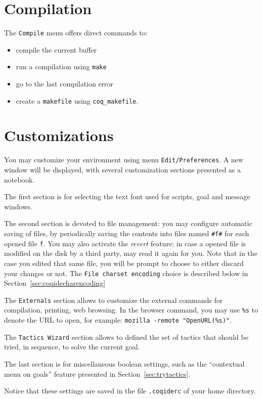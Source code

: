 \section{Compilation}

The \verb|Compile| menu offers direct commands to:
\begin{itemize}
\item compile the current buffer
\item run a compilation using \verb|make|
\item go to the last compilation error
\item create a \verb|makefile| using \verb|coq_makefile|.
\end{itemize}

\section{Customizations}

You may customize your environment using menu
\texttt{Edit/Preferences}. A new window will be displayed, with
several customization sections presented as a notebook. 

The first section is for selecting the text font used for scripts, goal
and message windows. 

The second section is devoted to file management: you may
configure automatic saving of files, by periodically saving the
contents into files named \verb|#f#| for each opened file
\verb|f|. You may also activate the \emph{revert} feature: in case a
opened file is modified on the disk by a third party, \CoqIDE{} may read
it again for you. Note that in the case you edited that same file, you
will be prompt to choose to either discard your changes or not. The
\texttt{File charset encoding} choice is described below in
Section~\ref{sec:coqidecharencoding}
 

The \verb|Externals| section allows to customize the external commands
for compilation, printing, web browsing. In the browser command, you
may use \verb|%s| to denote the URL to open, for example: %
\verb|mozilla -remote "OpenURL(%s)"|. 

The \verb|Tactics Wizard| section allows to defined the set of tactics
that should be tried, in sequence, to solve the current goal.

The last section is for miscellaneous boolean settings, such as the
``contextual menu on goals'' feature presented in
Section~\ref{sec:trytactics}. 

Notice that these settings are saved in the file \verb|.coqiderc| of
your home directory. 

